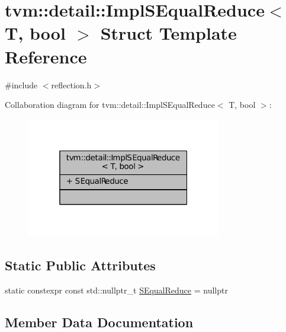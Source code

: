 \hypertarget{structtvm_1_1detail_1_1ImplSEqualReduce}{}\section{tvm\+:\+:detail\+:\+:Impl\+S\+Equal\+Reduce$<$ T, bool $>$ Struct Template Reference}
\label{structtvm_1_1detail_1_1ImplSEqualReduce}


{\ttfamily \#include $<$reflection.\+h$>$}



Collaboration diagram for tvm\+:\+:detail\+:\+:Impl\+S\+Equal\+Reduce$<$ T, bool $>$\+:
\nopagebreak
\begin{figure}[H]
\begin{center}
\leavevmode
\includegraphics[width=241pt]{structtvm_1_1detail_1_1ImplSEqualReduce__coll__graph}
\end{center}
\end{figure}
\subsection*{Static Public Attributes}
\begin{DoxyCompactItemize}
\item 
static constexpr const std\+::nullptr\+\_\+t \hyperlink{structtvm_1_1detail_1_1ImplSEqualReduce_a2069b17f164be27516b0ca7b53b74d49}{S\+Equal\+Reduce} = nullptr
\end{DoxyCompactItemize}


\subsection{Member Data Documentation}
